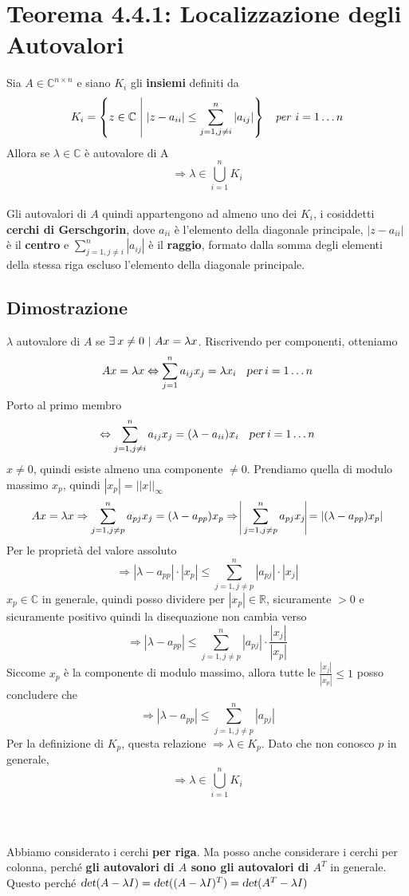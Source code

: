 \documentclass[10pt]{book}
\begin{document}
\section{Teorema 4.4.1: Localizzazione degli Autovalori}
Sia $A \in \mathbb{C}^{n \times n}$ e siano $K_i$ gli \textbf{insiemi} definiti da $$K_i = \left\{z \in \mathbb{C} \:\:\vline\:\: |z-a_{ii}| \leq \sum_{j = 1, j \neq i}^n |a_{ij}|\right\}\:\:\:\:\textit{per}\:\:i = 1 \ldots n$$ Allora se $\lambda \in \mathbb{C}$ è autovalore di A $$\Rightarrow \lambda \in \bigcup_{i = 1}^n K_i$$\\
Gli autovalori di $A$ quindi appartengono ad almeno uno dei $K_i$, i cosiddetti \textbf{cerchi di Gerschgorin}, dove $a_{ii}$ è l'elemento della diagonale principale, $|z - a_{ii}|$ è il \textbf{centro} e $\sum_{j = 1, j \neq i}^n |a_{ij}|$ è il \textbf{raggio}, formato dalla somma degli elementi della stessa riga escluso l'elemento della diagonale principale.
\subsection{Dimostrazione} $\lambda$ autovalore di $A$ se $\exists\:x \neq 0 \:\:\vline\:\: Ax = \lambda x$. Riscrivendo per componenti, otteniamo
$$Ax = \lambda x \Leftrightarrow \sum_{j = 1}^n a_{ij}x_j = \lambda x_i\:\:\:\:\textsl{per}\:i = 1\ldots n$$
Porto al primo membro
$$\Leftrightarrow  \sum_{j = 1, j \neq i}^n a_{ij}x_j = (\lambda - a_{ii})x_i\:\:\:\:\textsl{per}\:i = 1\ldots n$$
$x \neq 0$, quindi esiste almeno una componente $\neq 0$. Prendiamo quella di modulo massimo $x_p$, quindi $|x_p| = ||x||_\infty$
$$Ax = \lambda x \Rightarrow \sum_{j = 1, j \neq p}^n a_{pj}x_j = (\lambda - a_{pp})x_p \Rightarrow\:\vline\sum_{j = 1, j \neq p}^n a_{pj}x_j\vline = |(\lambda - a_{pp})x_p|$$
Per le proprietà del valore assoluto
$$\Rightarrow |\lambda - a_{pp}|\cdot|x_p| \leq \sum_{j = 1, j \neq p}^n |a_{pj}|\cdot |x_j| $$
$x_p \in \mathbb{C}$ in generale, quindi posso dividere per $|x_p| \in \mathbb{R}$, sicuramente $> 0$ e sicuramente positivo quindi la disequazione non cambia verso
$$\Rightarrow |\lambda - a_{pp}| \leq \sum_{j = 1, j \neq p}^n |a_{pj}|\cdot \frac{|x_j|}{|x_p|} $$
Siccome $x_p$ è la componente di modulo massimo, allora tutte le $\frac{|x_j|}{|x_p|} \leq 1$ posso concludere che
$$\Rightarrow |\lambda - a_{pp}| \leq \sum_{j = 1, j \neq p}^n |a_{pj}|$$
Per la definizione di $K_p$, questa relazione $\Rightarrow \lambda \in K_p$. Dato che non conosco $p$ in generale, $$\Rightarrow \lambda \in \bigcup_{i = 1}^n K_i$$\\\\\\
Abbiamo considerato i cerchi \textbf{per riga}. Ma posso anche considerare i cerchi per colonna, perché \textbf{gli autovalori di $A$ sono gli autovalori di $A^T$} in generale.\\
Questo perché $\textsl{det}(A - \lambda I) = \textsl{det}((A - \lambda I)^T) = \textsl{det}(A^T - \lambda I)$
\end{document}
